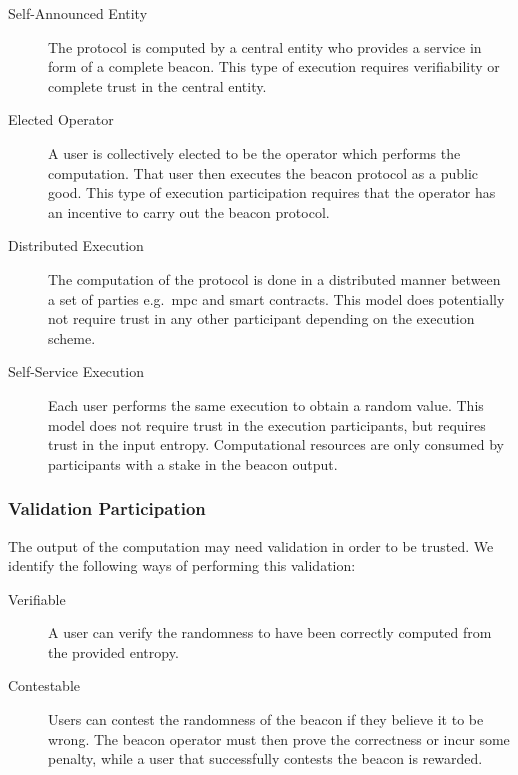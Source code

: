 \begin{description}
    \item[Self-Announced Entity] The protocol is computed by a central entity who provides a service in form of a complete beacon. This type of execution requires verifiability or complete trust in the central entity.
    \item[Elected Operator] A user is collectively elected to be the operator which performs the computation. That user then executes the beacon protocol as a public good. This type of execution participation requires that the operator has an incentive to carry out the beacon protocol.
    \item[Distributed Execution] The computation of the protocol is done in a distributed manner between a set of parties e.g.\ \gls{mpc} and smart contracts. This model does potentially not require trust in any other participant depending on the execution scheme.
    \item[Self-Service Execution] Each user performs the same execution to obtain a random value. This model does not require trust in the execution participants, but requires trust in the input entropy. Computational resources are only consumed by participants with a stake in the beacon output.
\end{description}

\subsubsection{Validation Participation}
The output of the computation may need validation in order to be trusted. We identify the following ways of performing this validation:
\begin{description}
    \item [Verifiable] A user can verify the randomness to have been correctly computed from the provided entropy. 
    \item [Contestable] Users can contest the randomness of the beacon if they believe it to be wrong. The beacon operator must then prove the correctness or incur some penalty, while a user that successfully contests the beacon is rewarded. 
\end{description}
